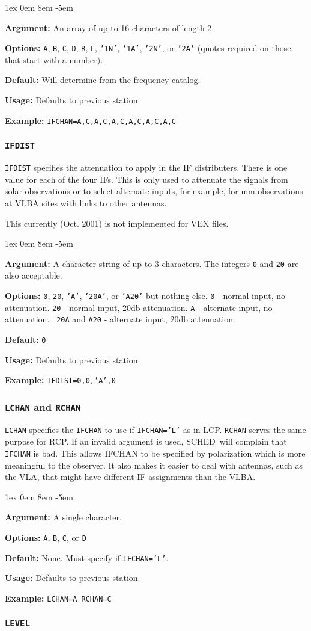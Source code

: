 \documentclass{report}
\newcommand{\schedb}{{\sc SCHED~}}
\newcommand{\rcwbox}[5]{
  \begin{list}{}{\parsep 1ex  \itemsep 0em
                 \leftmargin 8em  \itemindent -5em }
    \item {\bf Argument:} #1
    \item {\bf Options:}  #2
    \item {\bf Default:}  #3
    \item {\bf Usage:}    #4
    \item {\bf Example:}  #5
  \end{list}
}
\begin{document}
\rcwbox
{An array of up to 16 characters of length 2.}
{{\tt A}, {\tt B}, {\tt C}, {\tt D}, {\tt R}, {\tt L},
{\tt '1N'}, {\tt '1A'}, {\tt '2N'}, or {\tt '2A'} (quotes required
on those that start with a number).}
{Will determine from the frequency catalog.}
{Defaults to previous station.}
{{\tt IFCHAN=A,C,A,C,A,C,A,C,A,C,A,C}}


\subsubsection{\label{SP:IFDIST}{\tt IFDIST}}

{\tt IFDIST} specifies the attenuation to apply in the IF distributers.
There is one value for each of the four IFs. This is only used to
attenuate the signals from solar observations or to select alternate
inputs, for example, for mm observations at VLBA sites with links to
other antennas.

This currently (Oct. 2001) is not implemented for VEX files.

\rcwbox
{A character string of up to 3 characters. The integers {\tt 0} and
{\tt 20} are also acceptable.}
{{\tt 0}, {\tt 20}, {\tt 'A'}, {\tt '20A'}, or {\tt 'A20'} but nothing
else. {\tt 0} - normal input, no attenuation. {\tt 20} - normal input,
20db attenuation. {\tt A} - alternate input, no attenuation. {\tt
20A} and {\tt A20} - alternate input, 20db attenuation.}
{{\tt 0}}
{Defaults to previous station.}
{{\tt IFDIST=0,0,'A',0}}


\subsubsection{\label{SP:LCHAN}{\tt LCHAN} and {\tt RCHAN}}

{\tt LCHAN} specifies the {\tt IFCHAN} to use if {\tt IFCHAN='L'} as
in LCP.  {\tt RCHAN} serves the same purpose for RCP.  If an invalid
argument is used, \schedb will complain that {\tt IFCHAN} is bad.
This allows IFCHAN to be specified by polarization which is more
meaningful to the observer.  It also makes it easier to deal with
antennas, such as the VLA, that might have different IF assignments
than the VLBA.

\rcwbox
{A single character.}
{{\tt A}, {\tt B}, {\tt C}, or {\tt D}}
{None. Must specify if {\tt IFCHAN='L'}.}
{Defaults to previous station.}
{{\tt LCHAN=A  RCHAN=C}}


\subsubsection{\label{SP:LEVEL}{\tt LEVEL}}
\end{document}
